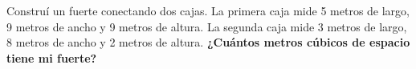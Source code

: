 Construí un fuerte conectando dos cajas.
La primera caja mide 5 metros de largo, 9 metros de ancho y 9 metros de altura.
La segunda caja mide 3 metros de largo, 8 metros de ancho y 2 metros de altura.
\textbf{¿Cuántos metros cúbicos de espacio tiene mi fuerte?}



